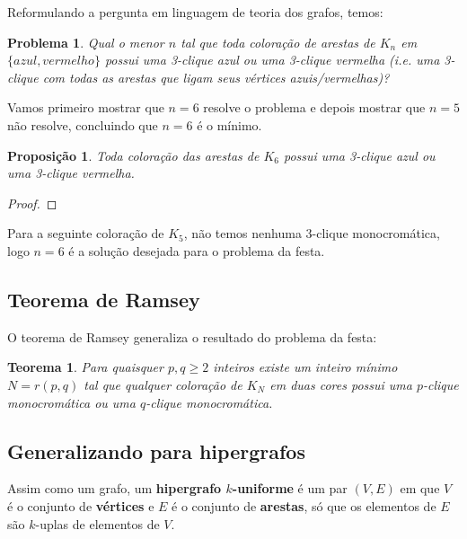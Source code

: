 \documentclass[a4paper]{book}
\newtheorem{prop}{Proposição}
\newtheorem{problem}{Problema}
\newtheorem{teorema}{Teorema}
\begin{document}
Reformulando a pergunta em linguagem de teoria dos grafos, temos:

\begin{problem}
    Qual o menor $n$ tal que toda coloração de arestas de $K_n$ em $\{azul, vermelho\}$ possui uma 3-clique azul ou uma 3-clique vermelha (i.e. uma 3-clique com todas as arestas que ligam seus vértices azuis/vermelhas)?
\end{problem}

Vamos primeiro mostrar que $n=6$ resolve o problema e depois mostrar que $n=5$ não resolve, concluindo que $n=6$ é o mínimo.

\begin{prop}
Toda coloração das arestas de $K_6$ possui uma 3-clique azul ou uma 3-clique vermelha.
\end{prop}
\begin{proof}

\end{proof}

Para a seguinte coloração de $K_5$, não temos nenhuma 3-clique monocromática, logo $n=6$ é a solução desejada para o problema da festa.


\subsection {Teorema de Ramsey}
O teorema de Ramsey generaliza o resultado do problema da festa:

\begin{teorema}
    Para quaisquer $p,q\geq2$ inteiros existe um inteiro mínimo $N=r(p,q)$ tal que qualquer coloração de $K_N$ em duas cores possui uma $p$-clique monocromática ou uma $q$-clique monocromática.
\end{teorema}

\subsection {Generalizando para hipergrafos}
Assim como um grafo, um \textbf{hipergrafo $k$-uniforme} é um par $(V,E)$ em que $V$ é o conjunto de \textbf{vértices} e $E$ é o conjunto de \textbf{arestas}, só que os elementos de $E$ são $k$-uplas de elementos de $V$.
\end{document}

